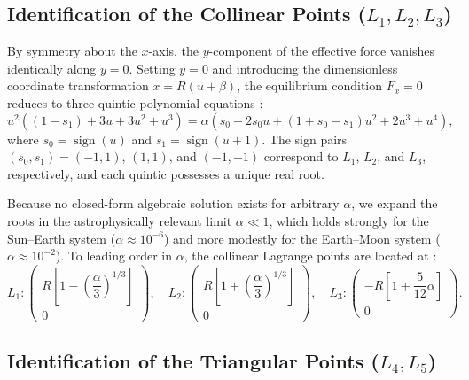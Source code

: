 \documentclass[12pt, letterpaper]{article}
\begin{document}
\subsection{Identification of the Collinear Points (\texorpdfstring{$L_1, L_2, L_3$}{L1, L2, L3})}

By symmetry about the $x$-axis, the $y$-component of the effective force vanishes identically along $y = 0$. Setting $y = 0$ and introducing the dimensionless coordinate transformation $x = R(u + \beta)$, the equilibrium condition $F_x = 0$ reduces to three quintic polynomial equations \cite{cornish}:
$$
u^2\left((1 - s_1) + 3u + 3u^2 + u^3\right) = \alpha\left(s_0 + 2s_0 u + (1 + s_0 - s_1)u^2 + 2u^3 + u^4\right),
$$
where $s_0 = \operatorname{sign}(u)$ and $s_1 = \operatorname{sign}(u + 1)$. The sign pairs $(s_0, s_1) = (-1, 1)$, $(1, 1)$, and $(-1, -1)$ correspond to $L_1$, $L_2$, and $L_3$, respectively, and each quintic possesses a unique real root.

Because no closed-form algebraic solution exists for arbitrary $\alpha$, we expand the roots in the astrophysically relevant limit $\alpha \ll 1$, which holds strongly for the Sun--Earth system ($\alpha \approx 10^{-6}$) and more modestly for the Earth--Moon system ($\alpha \approx 10^{-2}$). To leading order in $\alpha$, the collinear Lagrange points are located at \cite{cornish}:
\begin{equation}
L_1: \begin{pmatrix} R\left[1 - \left(\dfrac{\alpha}{3}\right)^{1/3}\right] \\ 0 \end{pmatrix}, \quad
L_2: \begin{pmatrix} R\left[1 + \left(\dfrac{\alpha}{3}\right)^{1/3}\right] \\ 0 \end{pmatrix}, \quad
L_3: \begin{pmatrix} -R\left[1 + \dfrac{5}{12}\alpha\right] \\ 0 \end{pmatrix}.
\label{eq:collinear_approx}
\end{equation}

\subsection{Identification of the Triangular Points (\texorpdfstring{$L_4, L_5$}{L4, L5})}
\end{document}
